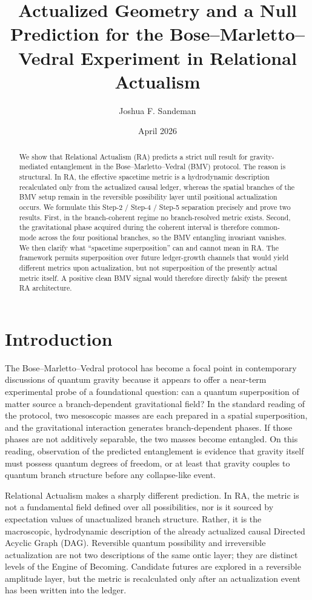\documentclass[11pt]{article}
\title{Actualized Geometry and a Null Prediction for the Bose--Marletto--Vedral Experiment in Relational Actualism}
\author{Joshua F. Sandeman}
\date{April 2026}
\begin{document}
\maketitle

\begin{abstract}
We show that Relational Actualism (RA) predicts a strict null result for gravity-mediated entanglement in the Bose--Marletto--Vedral (BMV) protocol. The reason is structural. In RA, the effective spacetime metric is a hydrodynamic description recalculated only from the actualized causal ledger, whereas the spatial branches of the BMV setup remain in the reversible possibility layer until positional actualization occurs. We formulate this Step-2 / Step-4 / Step-5 separation precisely and prove two results. First, in the branch-coherent regime no branch-resolved metric exists. Second, the gravitational phase acquired during the coherent interval is therefore common-mode across the four positional branches, so the BMV entangling invariant vanishes. We then clarify what ``spacetime superposition'' can and cannot mean in RA. The framework permits superposition over future ledger-growth channels that would yield different metrics upon actualization, but not superposition of the presently actual metric itself. A positive clean BMV signal would therefore directly falsify the present RA architecture.
\end{abstract}

\section{Introduction}

The Bose--Marletto--Vedral protocol has become a focal point in contemporary discussions of quantum gravity because it appears to offer a near-term experimental probe of a foundational question: can a quantum superposition of matter source a branch-dependent gravitational field? In the standard reading of the protocol, two mesoscopic masses are each prepared in a spatial superposition, and the gravitational interaction generates branch-dependent phases. If those phases are not additively separable, the two masses become entangled. On this reading, observation of the predicted entanglement is evidence that gravity itself must possess quantum degrees of freedom, or at least that gravity couples to quantum branch structure before any collapse-like event.

Relational Actualism makes a sharply different prediction. In RA, the metric is not a fundamental field defined over all possibilities, nor is it sourced by expectation values of unactualized branch structure. Rather, it is the macroscopic, hydrodynamic description of the already actualized causal Directed Acyclic Graph (DAG). Reversible quantum possibility and irreversible actualization are not two descriptions of the same ontic layer; they are distinct levels of the Engine of Becoming. Candidate futures are explored in a reversible amplitude layer, but the metric is recalculated only after an actualization event has been written into the ledger.
\end{document}
